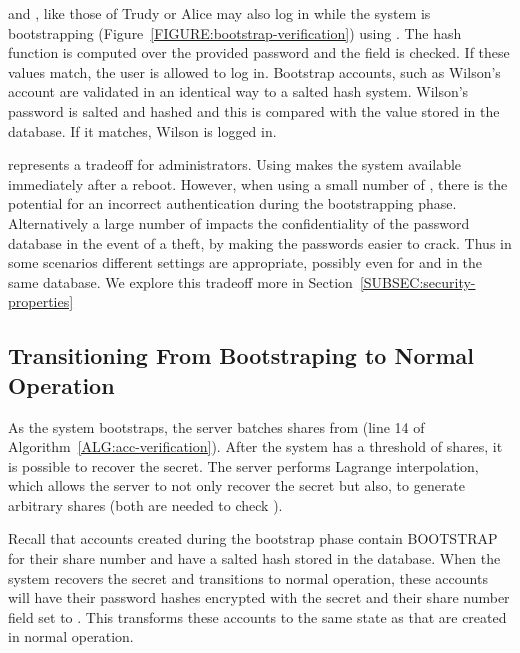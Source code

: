 \Thresholdaccounts and \thresholdlessaccounts, like those of Trudy or Alice may
also log in while the system is bootstrapping
(Figure~\ref{FIGURE:bootstrap-verification}) using \partialverification.  The
\partialverification hash function is computed over the provided password and
the \partialbytes field is checked.  If these values match, the user is allowed
to log in. Bootstrap accounts, such as Wilson's account are validated in an
identical way to a salted hash system.  Wilson's password is salted and hashed
and this is compared with the value stored in the database.  If it matches,
Wilson is logged in.

\Partialverification represents a tradeoff for administrators.  Using 
\partialverification makes the system available immediately after a reboot.  
However, when using a small number of \partialbytes, there is the potential
for an incorrect authentication during the bootstrapping phase.  Alternatively
a large number of \partialbytes impacts the confidentiality of the password
database in the event of a theft, by making the passwords easier to crack.
Thus in some scenarios different settings are appropriate, possibly
even for \thresholdaccounts and \thresholdlessaccounts in the same database.
We explore this tradeoff more in Section~\ref{SUBSEC:security-properties}

\subsection{Transitioning From Bootstraping to Normal Operation}
\label{SUBSEC:bootstrap-transitioning}

As the system bootstraps, the server batches shares from \thresholdaccounts
(line 14 of Algorithm~\ref{ALG:acc-verification}).   After the system has a
threshold of shares, it is possible to recover the secret. The server performs
Lagrange interpolation, which allows the server to not only recover the secret
but also, to generate arbitrary shares (both are needed to check \thresholdlessaccounts).  

Recall that accounts created during the bootstrap phase contain BOOTSTRAP for
their share number and have a salted hash stored in the database.  When the
system recovers the secret and transitions to normal operation, these accounts
will have their password hashes encrypted with the secret and their share
number field set to \THRESHOLDLESS.  This transforms these accounts to the same
state as \thresholdlessaccounts that are created in normal operation.

